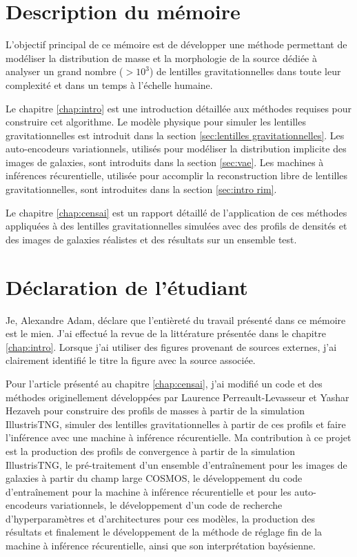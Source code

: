 \section{Description du mémoire}

L'objectif principal de ce mémoire est de développer une méthode permettant de 
modéliser la distribution de masse et 
la morphologie de la source dédiée à analyser un grand nombre ($> 10^{3}$)
de lentilles gravitationnelles dans toute leur complexité et dans un temps à l'échelle humaine. 

Le chapitre \ref{chap:intro} est une introduction détaillée aux méthodes requises pour construire 
cet algorithme. Le modèle physique pour simuler les lentilles gravitationnelles est introduit dans la section \ref{sec:lentilles gravitationnelles}. 
Les auto-encodeurs variationnels, utilisés pour modéliser la distribution implicite des images de galaxies, sont introduits dans la section \ref{sec:vae}.  
Les machines à inférences récurentielle, utilisée pour accomplir la reconstruction libre de lentilles gravitationnelles, sont introduites dans la section \ref{sec:intro rim}.

Le chapitre \ref{chap:censai} est un rapport détaillé de l'application de ces méthodes 
appliquées à des lentilles gravitationnelles simulées 
avec des profils de densités et des images de galaxies réalistes 
et des résultats sur un ensemble test. 

\section{Déclaration de l'étudiant}
Je, Alexandre Adam, déclare que l'entièreté du travail présenté dans ce mémoire est le mien. J'ai effectué la revue de 
la littérature présentée dans le chapitre \ref{chap:intro}. Lorsque j'ai utiliser des figures provenant de sources externes, j'ai clairement 
identifié le titre la figure avec la source associée.

Pour l'article présenté au chapitre \ref{chap:censai}, j'ai modifié un code et des méthodes originellement 
développées par Laurence Perreault-Levasseur et Yashar Hezaveh pour construire des profils de masses à partir 
de la simulation IllustrisTNG, simuler des lentilles gravitationnelles à partir de ces profils et faire l'inférence avec une 
machine à inférence récurentielle. Ma contribution à ce projet est la 
production des profils de convergence à partir de la simulation IllustrisTNG, le pré-traitement 
d'un ensemble d'entraînement pour les images de galaxies à partir du champ large COSMOS, le 
développement du code d'entraînement pour la machine à inférence récurentielle et pour les auto-encodeurs 
variationnels, le développement d'un code de recherche d'hyperparamètres et d'architectures pour ces modèles, 
la production des résultats et finalement 
le développement de la méthode de réglage fin de la machine à inférence récurentielle, 
ainsi que son interprétation bayésienne.

